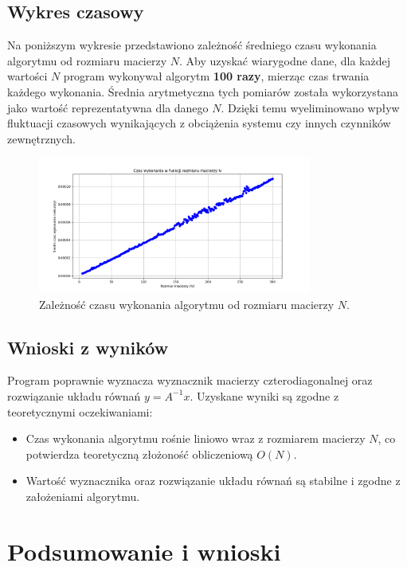 \documentclass[a4paper,12pt]{article}
\begin{document}
\subsection{Wykres czasowy}

Na poniższym wykresie przedstawiono zależność średniego czasu wykonania algorytmu od rozmiaru macierzy $N$. Aby uzyskać wiarygodne dane, dla każdej wartości $N$ program wykonywał algorytm \textbf{100 razy}, mierząc czas trwania każdego wykonania. Średnia arytmetyczna tych pomiarów została wykorzystana jako wartość reprezentatywna dla danego $N$. Dzięki temu wyeliminowano wpływ fluktuacji czasowych wynikających z obciążenia systemu czy innych czynników zewnętrznych.

\begin{figure}[h!]
    \centering
    \includegraphics[width=0.8\textwidth]{execution_time_plot.png}
    \caption{Zależność czasu wykonania algorytmu od rozmiaru macierzy $N$.}
    \label{fig:execution_time_plot}
\end{figure}

\subsection{Wnioski z wyników}

Program poprawnie wyznacza wyznacznik macierzy czterodiagonalnej oraz rozwiązanie układu równań $y = A^{-1}x$. Uzyskane wyniki są zgodne z teoretycznymi oczekiwaniami:
\begin{itemize}
    \item Czas wykonania algorytmu rośnie liniowo wraz z rozmiarem macierzy $N$, co potwierdza teoretyczną złożoność obliczeniową $O(N)$.
    \item Wartość wyznacznika oraz rozwiązanie układu równań są stabilne i zgodne z założeniami algorytmu.
\end{itemize}


\section{Podsumowanie i wnioski}
\end{document}
